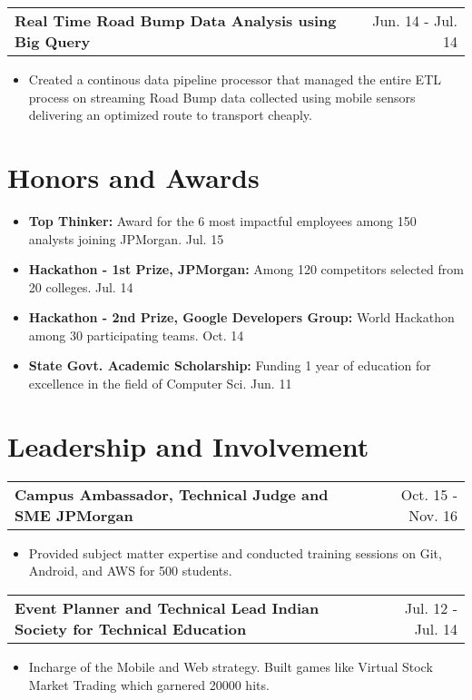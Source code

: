 \documentclass[a4paper,10pt]{article}
\makeatletter
\newcommand{\projectHeading}[2]{
    \begin{tabular*}{1\textwidth}{l@{\extracolsep{\fill}}r}
      \large{\textbf{#1}} & \small{#2} 
    \end{tabular*}
}
\newcommand{\resumeItemListStart}{\begin{itemize}[topsep=2pt, parsep=2pt, listparindent=0pt, itemindent=0pt, itemsep=1pt, leftmargin=*]}
\newcommand{\resumeItemListEnd}{\end{itemize}}
\makeatother
\begin{document}
   \projectHeading{Real Time Road Bump Data Analysis using Big Query}{Jun. 14 - Jul. 14} 
   \resumeItemListStart
      \item\small{Created a continous data pipeline processor that managed the entire ETL process on streaming Road Bump data collected using mobile sensors delivering an optimized route to transport cheaply.}
   \resumeItemListEnd
   
 
\section{Honors and Awards}
  \resumeItemListStart
    \item\small{\textbf{Top Thinker: }
      {Award for the 6 most impactful employees among 150 analysts joining JPMorgan.}\hfill{} {Jul. 15}}
    \item\small{\textbf{Hackathon - 1st Prize, JPMorgan: }
      {Among 120 competitors selected from 20 colleges.}\hfill{} {Jul. 14}}
    \item\small{\textbf{Hackathon - 2nd Prize, Google Developers Group: }
      {World Hackathon among 30 participating teams.}\hfill{} {Oct. 14}}
    \item\small{\textbf{State Govt. Academic Scholarship: }
    {Funding 1 year of education for excellence in the field of Computer Sci.}\hfill{} {Jun. 11}}
  \resumeItemListEnd


\section{Leadership and Involvement}
    
    \projectHeading{Campus Ambassador, Technical Judge and SME \textbar{} JPMorgan}{Oct. 15 - Nov. 16}
    \resumeItemListStart
    	\item\small{Provided subject matter expertise and conducted training sessions on Git, Android, and AWS for 500 students.}
    \resumeItemListEnd
    
    \projectHeading{Event Planner and Technical Lead \textbar{} Indian Society for Technical Education }{Jul. 12 - Jul. 14}
    \resumeItemListStart
    	\item\small{Incharge of the Mobile and Web strategy. Built games like Virtual Stock Market Trading which garnered 20000 hits.}
    \resumeItemListEnd
    

\end{document}

